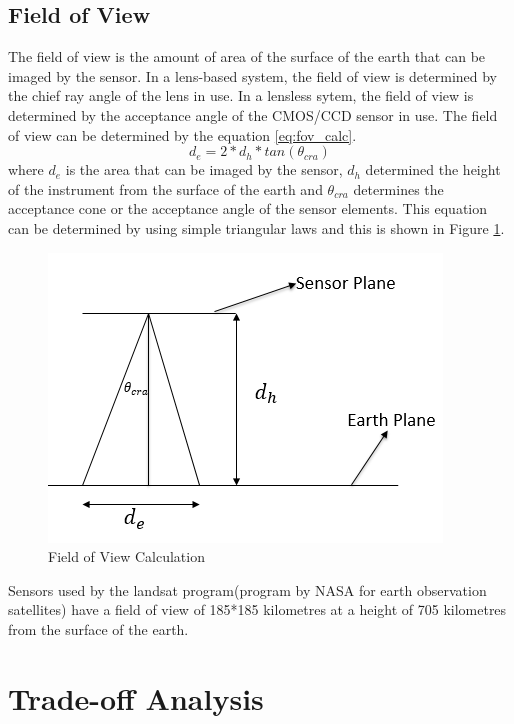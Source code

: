 \subsection{Field of View}
The field of view is the amount of area of the surface of the earth that can be imaged by the sensor. In a lens-based system, the field of view is determined by the chief ray angle of the lens in use. In a lensless sytem, the field of view is determined by the acceptance angle of the CMOS/CCD sensor in use. The field of view can be determined by the equation \ref{eq:fov_calc}.
\begin{equation}
\label{eq:fov_calc}
d_e = 2*d_h*tan(\theta_{cra})
\end{equation}
where $d_e$ is the area that can be imaged by the sensor, $d_h$ determined the height of the instrument from the surface of the earth and $\theta_{cra}$ determines the acceptance cone or the acceptance angle of the sensor elements. This equation can be determined by using simple triangular laws and this is shown in Figure \ref{fig:fov_calc}.
\begin{figure}[htb]
\includegraphics[width=\textwidth]{pics/fov}
\caption{Field of View Calculation}
\label{fig:fov_calc}
\end{figure}
Sensors used by the landsat program(program by NASA for earth observation satellites) have a field of view of 185*185 kilometres at a height of 705 kilometres from the surface of the earth\cite{landsat}. 

\section{Trade-off Analysis}
\label{sec:tradeOff}
